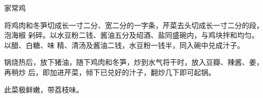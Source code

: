 %
%
%
%
%
%
%
\begin{recipe}{家常鸡}

\ingredients


\preparation

将鸡肉和冬笋切成长一寸二分、宽二分的一字条，芹菜去头切成长一寸二分的段，泡海椒
剁碎。以水豆粉二钱、酱油五分及绍酒、盐同盛碗内，与鸡块拌和均匀。以醋、白糖、味
精、清汤及酱油二钱，水豆粉一钱半，同入碗中兑成汁子。

锅烧热后，放下猪油，随下鸡肉和冬笋，炒到水气将干时，放入豆瓣、辣酱、姜，再稍炒
后，即加进芹菜，倾下已兑好的汁子，翻炒几下即可起锅。

\features

此菜极鲜嫩，带荔枝味。

\end{recipe}

